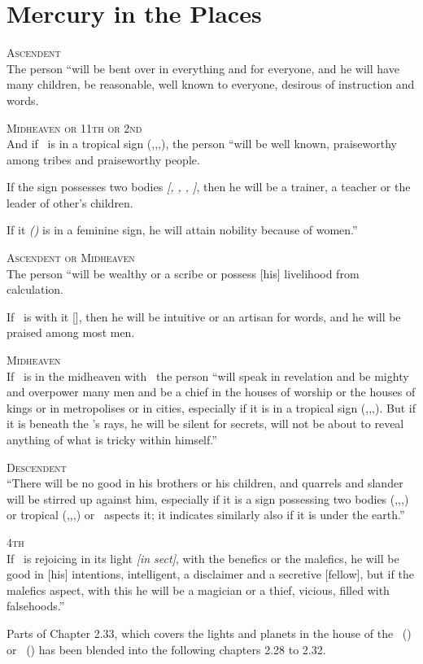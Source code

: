 \section{Mercury in the Places}

\noindent\textsc{Ascendent} \hfill \\
\indent The person ``will be bent over in everything and for everyone, and he will have many children, be reasonable, well known to everyone, desirous of instruction and words.

\noindent\textsc{Midheaven or 11th or 2nd} \hfill \\
\indent And if \Mercury\, is in a tropical sign (\Aries,\Cancer,\Libra,\Capricorn), the person ``will be well known, praiseworthy among tribes and praiseworthy people. 

If the sign possesses two bodies \textsl{[\Gemini, \Virgo, \Sagittarius, \Pisces]}, then he will be a trainer, a teacher or the leader of other's children.

If it \textsl{(\Mercury)} is in a feminine sign, he will attain nobility because of women.''

\noindent\textsc{Ascendent or Midheaven} \hfill \\
\indent The person ``will be wealthy or a scribe or possess [his] livelihood from calculation.

If \Venus\, is with it [\Mercury], then he will be intuitive or an artisan for words, and he will be praised among most men.

\noindent\textsc{Midheaven} \hfill \\
If \Mercury\, is in the midheaven with \Jupiter\, the person ``will speak in revelation and be mighty and overpower many men and be a chief in the houses of worship or the houses of kings or in metropolises or in cities, especially if it is in a tropical sign (\Aries,\Cancer,\Libra,\Capricorn). But if it is beneath the \Sun's rays, he will be silent for secrets, will not be about to reveal anything of what is tricky within himself.''

\noindent\textsc{Descendent} \hfill \\
\indent ``There will be no good in his brothers or his children, and quarrels and slander will be stirred up against him, especially if it is a sign possessing two bodies (\Gemini,\Virgo,\Sagittarius,\Pisces) or tropical (\Aries,\Cancer,\Libra,\Capricorn) or \Mars\, aspects it; it indicates similarly also if it is under the earth.''

\noindent\textsc{4th} \hfill \\
\indent If \Mercury\, is rejoicing in its light \textsl{[in sect]}, with the benefics or the malefics, he will be good in [his] intentions, intelligent, a disclaimer and a secretive [fellow], but if the malefics aspect, with this he will be a magician or a thief, vicious, filled with falsehoods.''

\begin{mdframed}[backgroundcolor=cyan!5, rightmargin=1em, leftmargin=1em]
Parts of Chapter 2.33, which covers the lights and planets in the house of the \Moon\, (\Cancer) or \Sun\, (\Leo) has been blended into the following chapters 2.28 to 2.32.
\end{mdframed}



